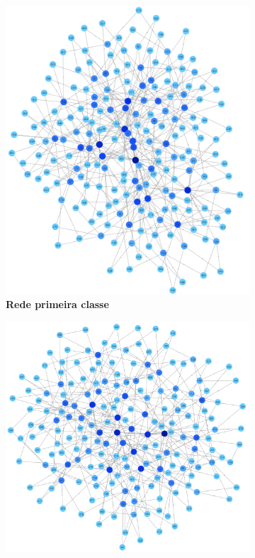 \documentclass[
12pt,        %
oneside,     %
a4paper,     %
english,       %
brazil        %
%
%
]{ppgca}
\begin{document}
\begin{figure}[H]
\centering
    \begin{subfigure}[b]{0.49\textwidth}
        \includegraphics[width=\textwidth]{moons0.png}
        \centering
        \caption{\textbf{Rede primeira classe}}
        \label{fig:moons0}
    \end{subfigure}
    \hfill
    \begin{subfigure}[b]{0.49\textwidth}
        \includegraphics[width=\textwidth]{moons1.png}

\end{subfigure}
\end{figure}
\end{document}
